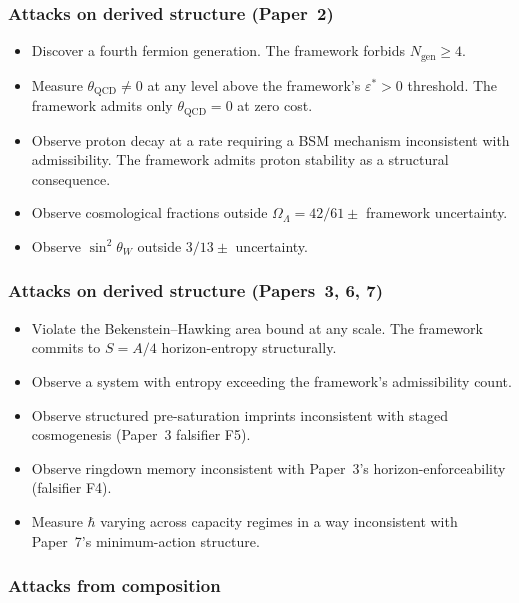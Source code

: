 \documentclass[11pt]{article}
\begin{document}
\subsubsection*{Attacks on derived structure (Paper~2)}

\begin{itemize}
    \item Discover a fourth fermion generation. The framework forbids $N_{\mathrm{gen}} \geq 4$.
    \item Measure $\theta_{\mathrm{QCD}} \neq 0$ at any level above the framework's $\varepsilon^* > 0$ threshold. The framework admits only $\theta_{\mathrm{QCD}} = 0$ at zero cost.
    \item Observe proton decay at a rate requiring a BSM mechanism inconsistent with admissibility. The framework admits proton stability as a structural consequence.
    \item Observe cosmological fractions outside $\Omega_\Lambda = 42/61 \pm$ framework uncertainty.
    \item Observe $\sin^2\theta_W$ outside $3/13 \pm$ uncertainty.
\end{itemize}

\subsubsection*{Attacks on derived structure (Papers~3, 6, 7)}

\begin{itemize}
    \item Violate the Bekenstein--Hawking area bound at any scale. The framework commits to $S = A/4$ horizon-entropy structurally.
    \item Observe a system with entropy exceeding the framework's admissibility count.
    \item Observe structured pre-saturation imprints inconsistent with staged cosmogenesis (Paper~3 falsifier F5).
    \item Observe ringdown memory inconsistent with Paper~3's horizon-enforceability (falsifier F4).
    \item Measure $\hbar$ varying across capacity regimes in a way inconsistent with Paper~7's minimum-action structure.
\end{itemize}

\subsubsection*{Attacks from composition}
\end{document}
